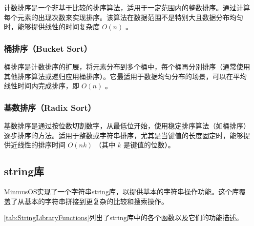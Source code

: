 计数排序是一个非基于比较的排序算法，适用于一定范围内的整数排序。通过计算每个元素的出现次数来实现排序。该算法在数据范围不是特别大且数据分布均匀时，能够提供线性的时间复杂度 $O(n)$ 。

\subsubsection{桶排序（Bucket Sort）}

桶排序是计数排序的扩展，将元素分布到多个桶中，每个桶再分别排序（通常使用其他排序算法或递归应用桶排序）。它最适用于数据均匀分布的场景，可以在平均线性时间内完成排序，即 $O(n)$ 。

\subsubsection{基数排序（Radix Sort）}

基数排序是通过按位数切割数字，从最低位开始，使用稳定排序算法（如桶排序）逐步排序的方法。适用于整数或字符串排序，尤其是当键值的长度固定时，能够提供近线性的排序时间 $O(nk)$ （其中 $k$ 是键值的位数）。

\subsection{string库}

MinmusOS实现了一个字符串string库，以提供基本的字符串操作功能。这个库覆盖了从基本的字符串拼接到更复杂的比较和搜索操作。

\cref{tab:StringLibraryFunctions}列出了string库中的各个函数以及它们的功能描述。

